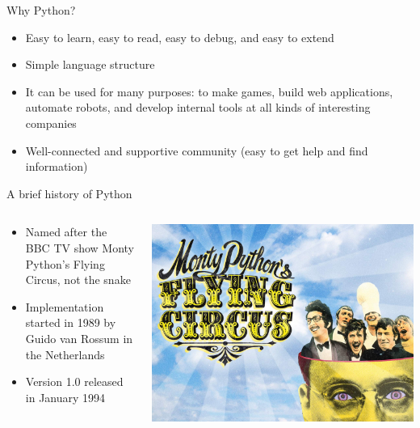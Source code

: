 \documentclass[aspectratio=169]{beamer}
\begin{document}
\begin{frame}{Why Python?}
    \begin{itemize}[label=--]
        \item Easy to learn, easy to read, easy to debug, and easy to extend
        \item Simple language structure
        \item It can be used for many purposes: to make games, build web applications, automate robots, and develop internal tools at all kinds of interesting companies
        \item Well-connected and supportive community (easy to get help and find information)
    \end{itemize}
\end{frame}


\begin{frame}{A brief history of Python}
    \begin{columns}
        \begin{column}{0.5\textwidth}
            \begin{itemize}[label=--]
                \item Named after the BBC TV show Monty Python's Flying Circus, not the snake
                \item Implementation started in 1989 by Guido van Rossum in the Netherlands 
                \item Version 1.0 released in January 1994
            \end{itemize}
        \end{column}
        \begin{column}{0.5\textwidth}
            \centering
            \includegraphics[width=\linewidth]{monty_python.jpg}
        \end{column}
    \end{columns}
\end{frame}
\end{document}
